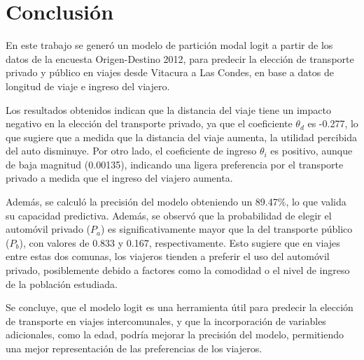\section{Conclusión}

En este trabajo se generó un modelo de partición modal logit a partir de los datos de la encuesta Origen-Destino 2012, para predecir la elección de transporte privado y público en viajes desde Vitacura a Las Condes, en base a datos de longitud de viaje e ingreso del viajero.  

Los resultados obtenidos indican que la distancia del viaje tiene un impacto negativo en la elección del transporte privado, ya que el coeficiente $\theta_d$ es -0.277, lo que sugiere que a medida que la distancia del viaje aumenta, la utilidad percibida del auto disminuye. Por otro lado, el coeficiente de ingreso $\theta_i$ es positivo, aunque de baja magnitud (0.00135), indicando una ligera preferencia por el transporte privado a medida que el ingreso del viajero aumenta.

Además, se calculó la precisión del modelo obteniendo un 89.47\%, lo que valida su capacidad predictiva. Además, se observó que la probabilidad de elegir el automóvil privado ($P_a$) es significativamente mayor que la del transporte público ($P_b$), con valores de 0.833 y 0.167, respectivamente. Esto sugiere que en viajes entre estas dos comunas, los viajeros tienden a preferir el uso del automóvil privado, posiblemente debido a factores como la comodidad o el nivel de ingreso de la población estudiada.

Se concluye, que el modelo logit es una herramienta útil para predecir la elección de transporte en viajes intercomunales, y que la incorporación de variables adicionales, como la edad, podría mejorar la precisión del modelo, permitiendo una mejor representación de las preferencias de los viajeros.